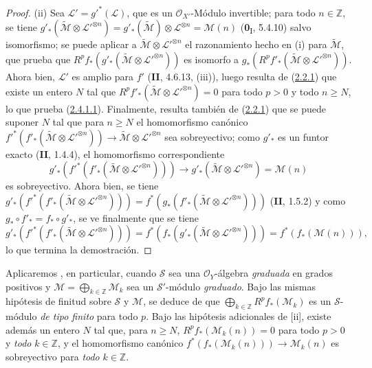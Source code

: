 \begin{proof}
(ii) Sea $\mathcal L'=g'^*(\mathcal L)$, que es un
$\mathcal O_{X'}$-Módulo invertible; para todo $n\in\mathbb Z$, se tiene
$g'_*(\widetilde{\mathcal M}\otimes\mathcal L'^{\otimes n})
=g'_*(\widetilde{\mathcal M})\otimes\mathcal L^{\otimes n}
=\mathcal M(n)$
(\textbf{0}\textsubscript{I}, 5.4.10) salvo isomorfismo; se puede aplicar
a $\widetilde{\mathcal M}\otimes\mathcal L'^{\otimes n}$ el
razonamiento hecho en (i) para $\widetilde{\mathcal M}$, que prueba que
$R^pf_*(g'_*(\widetilde{\mathcal M}\otimes\mathcal L'^{\otimes n}))$
es isomorfo a
$g_*(R^pf'_*(\widetilde{\mathcal M}\otimes\mathcal L'^{\otimes n}))$.
Ahora bien, $\mathcal L'$ es amplio para $f'$ (\textbf{II}, 4.6.13, (iii)), luego resulta
de (\hyperref[III.2.2.1-fr]{2.2.1}) que existe un entero $N$ tal que
$R^pf'_*(\widetilde{\mathcal M}\otimes\mathcal L'^{\otimes n})=0$
para todo $p>0$ y todo $n\geq N$, lo que prueba
(\hyperref[III.2.4.1.1-fr]{2.4.1.1}). Finalmente, resulta también de
(\hyperref[III.2.2.1-fr]{2.2.1}) que se puede suponer $N$ tal que para
$n\geq N$ el homomorfismo canónico
$f'^*(f'_*(\widetilde{\mathcal M}\otimes\mathcal L'^{\otimes n}))
\longrightarrow\widetilde{\mathcal M}\otimes\mathcal L'^{\otimes n}$
sea sobreyectivo; como $g'_*$ es un funtor exacto (\textbf{II}, 1.4.4),
el homomorfismo correspondiente
\[
g'_*(f'^*(f'_*(\widetilde{\mathcal M}\otimes
\mathcal L'^{\otimes n})))
\longrightarrow
g'_*(\widetilde{\mathcal M}\otimes\mathcal L'^{\otimes n})
=\mathcal M(n)
\]
es sobreyectivo. Ahora bien, se tiene
$g'_*(f'^*(f'_*(\widetilde{\mathcal M}\otimes
\mathcal L'^{\otimes n})))
=f^*(g_*(f'_*(\widetilde{\mathcal M}\otimes
\mathcal L'^{\otimes n})))$
(\textbf{II}, 1.5.2) y como $g_*\circ f'_* = f_*\circ g'_*$, se ve
finalmente que se tiene
\[
g'_*(f'^*(f'_*(\widetilde{\mathcal M}\otimes\mathcal L'^{\otimes n})))
=f^*(f_*(g'_*(\widetilde{\mathcal M}\otimes
\mathcal L'^{\otimes n})))=f^*(f_*(\mathcal M(n))),
\]
lo que termina la demostración.
\end{proof}

\begin{env}[2.4.2]
\label{III.2.4.2}
\label{III.2.4.2-fr}
Aplicaremos , en particular, cuando $\mathcal S$ sea una $\mathcal O_Y$-álgebra \emph{graduada} en grados positivos y
$\mathcal M=\bigoplus_{k\in\mathbb Z}\mathcal M_k$
sea un $\mathcal S'$-módulo \emph{graduado}.
Bajo las mismas hipótesis de finitud sobre $\mathcal S$ y $\mathcal M$, se deduce de  que
$\bigoplus_{k\in\mathbb Z}R^pf_*(\mathcal M_k)$
es un $\mathcal S$-módulo \emph{de tipo finito} para todo $p$.
Bajo las hipótesis adicionales de [ii], existe además un entero $N$ tal que, para $n\geq N$,
$R^pf_*(\mathcal M_k(n))=0$
para todo $p>0$ y \emph{todo} $k\in\mathbb Z$, y el homomorfismo canónico
$f^*(f_*(\mathcal M_k(n)))\to\mathcal M_k(n)$
es sobreyectivo para \emph{todo} $k\in\mathbb Z$.
\end{env}


